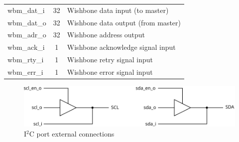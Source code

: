 \documentclass[a4paper,11pt]{article}
\begin{document}
\begin{table}[hbtp]
{\begin{tabular}{l c p{}}
    wbm\_dat\_i  & 32 & Wishbone data input (to master) \\
    wbm\_dat\_o  & 32 & Wishbone data output (from master) \\
    wbm\_adr\_o  & 32 & Wishbone address output \\
    wbm\_ack\_i  &  1 & Wishbone acknowledge signal input \\
    wbm\_rty\_i  &  1 & Wishbone retry signal input \\
    wbm\_err\_i  &  1 & Wishbone error signal input \\
    \hline
    \end{tabular}
  }
\end{table}

\begin{figure}[h]
  \centerline{\includegraphics[width=.75\textwidth]{fig/i2c-ports}}
  \caption{I$^2$C port external connections}
  \label{fig:i2c-ports}
\end{figure}
\end{document}

